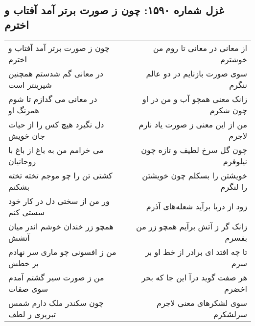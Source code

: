\begin{center}
\section*{غزل شماره ۱۵۹۰: چون ز صورت برتر آمد آفتاب و اخترم}
\label{sec:1590}
\begin{longtable}{l p{0.5cm} r}
چون ز صورت برتر آمد آفتاب و اخترم
&&
از معانی در معانی تا روم من خوشترم
\\
در معانی گم شدستم همچنین شیرینتر است
&&
سوی صورت بازنایم در دو عالم ننگرم
\\
در معانی می گدازم تا شوم همرنگ او
&&
زانک معنی همچو آب و من در او چون شکرم
\\
دل نگیرد هیچ کس را از حیات جان خویش
&&
من از این معنی ز صورت یاد نارم لاجرم
\\
می خرامم من به باغ از باغ با روحانیان
&&
چون گل سرخ لطیف و تازه چون نیلوفرم
\\
کشتی تن را چو موجم تخته تخته بشکنم
&&
خویشتن را بسکلم چون خویشتن را لنگرم
\\
ور من از سختی دل در کار خود سستی کنم
&&
زود از دریا برآید شعله‌های آذرم
\\
همچو زر خندان خوشم اندر میان آتشش
&&
زانک گر ز آتش برآیم همچو زر من بفسرم
\\
من ز افسونی چو ماری سر نهادم بر خطش
&&
تا چه افتد ای برادر از خط او بر سرم
\\
من ز صورت سیر گشتم آمدم سوی صفات
&&
هر صفت گوید درآ این جا که بحر اخضرم
\\
چون سکندر ملک دارم شمس تبریزی ز لطف
&&
سوی لشکرهای معنی لاجرم سرلشکرم
\\
\end{longtable}
\end{center}
